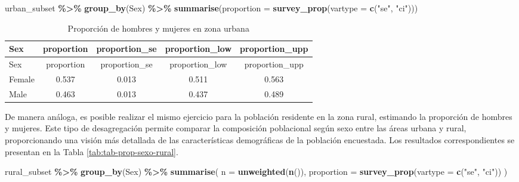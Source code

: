 \documentclass[
  spanish,
  12pt,
]{book}
\newenvironment{Shaded}{\begin{snugshade}}{\end{snugshade}}
\newcommand{\AttributeTok}[1]{\textcolor[rgb]{0.13,0.29,0.53}{#1}}
\newcommand{\FunctionTok}[1]{\textcolor[rgb]{0.13,0.29,0.53}{\textbf{#1}}}
\newcommand{\NormalTok}[1]{#1}
\newcommand{\SpecialCharTok}[1]{\textcolor[rgb]{0.81,0.36,0.00}{\textbf{#1}}}
\newcommand{\StringTok}[1]{\textcolor[rgb]{0.31,0.60,0.02}{#1}}
\begin{document}
\begin{Shaded}
\begin{Highlighting}[]
\NormalTok{urban\_subset }\SpecialCharTok{\%\textgreater{}\%}
  \FunctionTok{group\_by}\NormalTok{(Sex) }\SpecialCharTok{\%\textgreater{}\%}
  \FunctionTok{summarise}\NormalTok{(}\AttributeTok{proportion =} \FunctionTok{survey\_prop}\NormalTok{(}\AttributeTok{vartype =} \FunctionTok{c}\NormalTok{(}\StringTok{"se"}\NormalTok{, }\StringTok{"ci"}\NormalTok{)))}
\end{Highlighting}
\end{Shaded}

\begin{longtable}[]{@{}lcccc@{}}
\caption{\label{tab:tab-prop-sexo-urbano}Proporción de hombres y mujeres en zona urbana}\tabularnewline
\toprule\noalign{}
Sex & proportion & proportion\_se & proportion\_low & proportion\_upp \\
\midrule\noalign{}
\endfirsthead
\toprule\noalign{}
Sex & proportion & proportion\_se & proportion\_low & proportion\_upp \\
\midrule\noalign{}
\endhead
\bottomrule\noalign{}
\endlastfoot
Female & 0.537 & 0.013 & 0.511 & 0.563 \\
Male & 0.463 & 0.013 & 0.437 & 0.489 \\
\end{longtable}

De manera análoga, es posible realizar el mismo ejercicio para la población residente en la zona rural, estimando la proporción de hombres y mujeres. Este tipo de desagregación permite comparar la composición poblacional según sexo entre las áreas urbana y rural, proporcionando una visión más detallada de las características demográficas de la población encuestada. Los resultados correspondientes se presentan en la Tabla \ref{tab:tab-prop-sexo-rural}.

\begin{Shaded}
\begin{Highlighting}[]
\NormalTok{rural\_subset }\SpecialCharTok{\%\textgreater{}\%}
  \FunctionTok{group\_by}\NormalTok{(Sex) }\SpecialCharTok{\%\textgreater{}\%}
  \FunctionTok{summarise}\NormalTok{(}
    \AttributeTok{n =} \FunctionTok{unweighted}\NormalTok{(}\FunctionTok{n}\NormalTok{()),}
    \AttributeTok{proportion =} \FunctionTok{survey\_prop}\NormalTok{(}\AttributeTok{vartype =} \FunctionTok{c}\NormalTok{(}\StringTok{"se"}\NormalTok{, }\StringTok{"ci"}\NormalTok{))}
\NormalTok{  )}
\end{Highlighting}
\end{Shaded}
\end{document}
